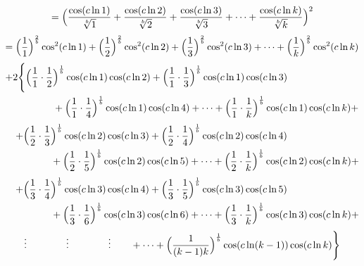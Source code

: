 \documentclass{amsart}
\begin{document}
	\[ = \Bigl( \frac{\cos({c\ln 1})}{\sqrt[b]{1}} + \frac{\cos({c\ln 2})}{\sqrt[b]{2}} + \frac{\cos({c\ln 3})}{\sqrt[b]{3}} + \dots + \frac{\cos({c\ln k})}{\sqrt[b]{k}} \Bigr)^2 \]
	\[ = \Bigl( \frac{1}{1} \Bigr)^{\frac2b}\cos^2({c \ln 1}) + \Bigl( \frac{1}{2} \Bigr)^{\frac2b}\cos^2({c \ln 2}) + \Bigl( \frac{1}{3} \Bigr)^{\frac2b}\cos^2({c \ln 3}) + \dots + \Bigl( \frac{1}{k} \Bigr)^{\frac2b}\cos^2({c \ln k}) \]
	\[
	\begin{aligned}
		+2\Biggl\{ \Bigl( \frac{1}{1} \cdot \frac{1}{2}& \Bigr)^\frac1b \cos(c \ln1) \cos(c \ln2) + \Bigl( \frac{1}{1} \cdot \frac{1}{3} \Bigr)^\frac1b \cos(c \ln 1) \cos(c \ln 3) \\ 
		& + \Bigl( \frac{1}{1} \cdot \frac{1}{4} \Bigr)^\frac1b \cos(c \ln 1) \cos(c \ln 4) + \dots + \Bigl( \frac{1}{1} \cdot \frac{1}{k} \Bigr)^\frac1b \cos(c \ln 1) \cos(c \ln k) + \\ 		
	\end{aligned}
	\]
	\[
	\begin{aligned}
		\quad + \Bigl( \frac{1}{2} \cdot \frac{1}{3}& \Bigr)^\frac1b \cos(c \ln2) \cos(c \ln3) + \Bigl( \frac{1}{2} \cdot \frac{1}{4} \Bigr)^\frac1b \cos(c \ln 2) \cos(c \ln 4) \\ 
		& + \Bigl( \frac{1}{2} \cdot \frac{1}{5} \Bigr)^\frac1b \cos(c \ln 2) \cos(c \ln 5) + \dots + \Bigl( \frac{1}{2} \cdot \frac{1}{k} \Bigr)^\frac1b \cos(c \ln 2) \cos(c \ln k) + \\ 		
	\end{aligned}
	\]
	\[
	\begin{aligned}
		\quad + \Bigl( \frac{1}{3} \cdot \frac{1}{4}& \Bigr)^\frac1b \cos(c \ln3) \cos(c \ln4) + \Bigl( \frac{1}{3} \cdot \frac{1}{5} \Bigr)^\frac1b \cos(c \ln 3) \cos(c \ln 5) \\ 
		& + \Bigl( \frac{1}{3} \cdot \frac{1}{6} \Bigr)^\frac1b \cos(c \ln 3) \cos(c \ln 6) + \dots + \Bigl( \frac{1}{3} \cdot \frac{1}{k} \Bigr)^\frac1b \cos(c \ln 3) \cos(c \ln k) + \\ 		
	\end{aligned}
	\]
	\[
	\begin{aligned}
		\vdots \qquad\qquad \vdots \qquad\qquad \vdots \qquad + \dots + \Bigl( \frac{1}{(k-1)k} \Bigr)^\frac1b \cos(c \ln (k-1)) \cos(c \ln k) \Biggr\}
	\end{aligned}
	\]
	
\end{document}
